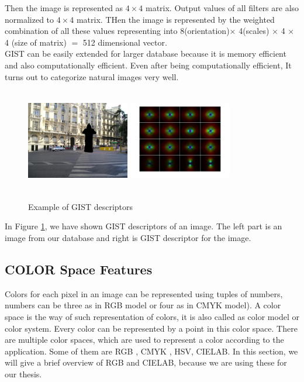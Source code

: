 Then the image is represented as $4 \times 4 $ matrix. Output values of all filters are also normalized to $4 \times 4 $ matrix. THen the image is represented by the weighted combination of all these values representing into 8(orientation)$\times$ 4(scales) $\times$  4 $\times$ 4 (size of matrix) $=$ 512 dimensional vector.\\
		GIST can be easily extended for larger database because it is memory efficient and also computationally efficient. Even after being computationally efficient, It turns out to categorize natural images very well.
\begin{center}
\begin{figure}	
\centering
\includegraphics[width=4.5cm, height=4.5cm]{./Pictures/GIST/gistImage.jpg}
\includegraphics[width=4.5cm, height=4.5cm]{./Pictures/GIST/gistExample.jpg}
\caption{Example of GIST descriptors}
\label{fig:gistExample}
\end{figure}
\end{center}
  		In Figure \ref{fig:gistExample}, we have shown GIST descriptors of an image. The left part is an image from our database and right is GIST descriptor for the image.
\subsection{COLOR Space Features}
Colors for each pixel in an image can be represented using tuples of numbers, numbers can be three as in RGB model or four as in CMYK model). A color space is the way of such representation of colors, it is also called as color model or color system. Every color can be represented by a point in this color space. There are multiple color spaces, which are used to represent a color according to the application. Some of them are RGB , CMYK , HSV, CIELAB. In this section, we will give a brief overview of RGB and CIELAB, because we are using these for our thesis.

